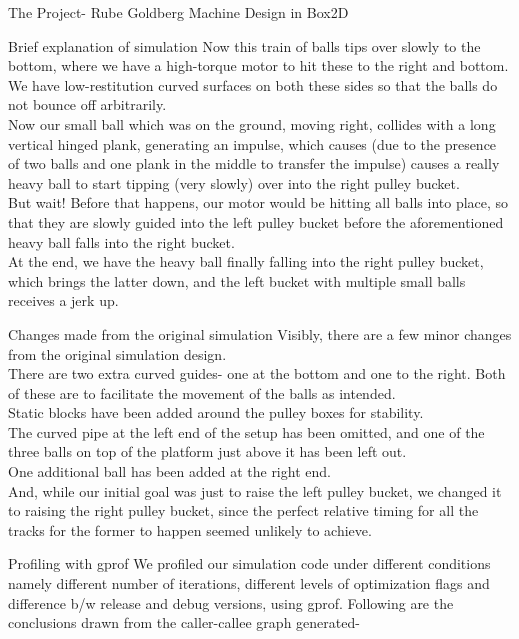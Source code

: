 \documentclass[a4paper,11pt]{article}
\begin{document}
\begin{section}{The Project- Rube Goldberg Machine Design in Box2D}
\begin{subsection}{Brief explanation of simulation}
Now this train of balls tips over slowly to the bottom, where we have a high-torque motor to hit these to the right and bottom. We have low-restitution curved surfaces on both these sides so that the balls do not bounce off arbitrarily.\\
Now our small ball which was on the ground, moving right, collides with a long vertical hinged plank, generating an impulse, which causes (due to the presence of two balls and one plank in the middle to transfer the impulse) causes a really heavy ball to start tipping (very slowly) over into the right pulley bucket.\\
But wait! Before that happens, our motor would be hitting all balls into place, so that they are slowly guided into the left pulley bucket before the aforementioned heavy ball falls into the right bucket.\\
At the end, we have the heavy ball finally falling into the right pulley bucket, which brings the latter down, and the left bucket with multiple small balls receives a jerk up.\cite{klepkolen}
\end{subsection}
\begin{subsection}{Changes made from the original simulation}
Visibly, there are a few minor changes from the original simulation design.\\
There are two extra curved guides- one at the bottom and one to the right. Both of these are to facilitate the movement of the balls as intended.\\
Static blocks have been added around the pulley boxes for stability.\\
The curved pipe at the left end of the setup has been omitted, and one of the three balls on top of the platform just above it has been left out.\\
One additional ball has been added at the right end.\\
And, while our initial goal was just to raise the left pulley bucket, we changed it to raising the right pulley bucket, since the perfect relative timing for all the tracks for the former to happen seemed unlikely to achieve.
\end{subsection}
\begin{subsection}{Profiling with gprof}
We profiled our simulation code under different conditions namely different number of iterations, different levels of optimization flags and difference b/w release and debug versions, using gprof. Following are the conclusions drawn from the caller-callee graph generated-
\end{subsection}

\end{section}
\end{document}
